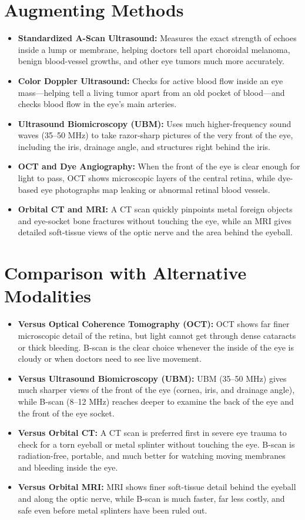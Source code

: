 \section{Augmenting Methods}
\begin{itemize}
    \item \textbf{Standardized A-Scan Ultrasound:} Measures the exact strength of echoes inside a lump or membrane, helping doctors tell apart choroidal melanoma, benign blood-vessel growths, and other eye tumors much more accurately.
    \item \textbf{Color Doppler Ultrasound:} Checks for active blood flow inside an eye mass---helping tell a living tumor apart from an old pocket of blood---and checks blood flow in the eye's main arteries.
    \item \textbf{Ultrasound Biomicroscopy (UBM):} Uses much higher-frequency sound waves (35--50 MHz) to take razor-sharp pictures of the very front of the eye, including the iris, drainage angle, and structures right behind the iris.
    \item \textbf{OCT and Dye Angiography:} When the front of the eye is clear enough for light to pass, OCT shows microscopic layers of the central retina, while dye-based eye photographs map leaking or abnormal retinal blood vessels.
    \item \textbf{Orbital CT and MRI:} A CT scan quickly pinpoints metal foreign objects and eye-socket bone fractures without touching the eye, while an MRI gives detailed soft-tissue views of the optic nerve and the area behind the eyeball.
\end{itemize}

\section{Comparison with Alternative Modalities}
\begin{itemize}
    \item \textbf{Versus Optical Coherence Tomography (OCT):} OCT shows far finer microscopic detail of the retina, but light cannot get through dense cataracts or thick bleeding. B-scan is the clear choice whenever the inside of the eye is cloudy or when doctors need to see live movement.
    \item \textbf{Versus Ultrasound Biomicroscopy (UBM):} UBM (35--50 MHz) gives much sharper views of the front of the eye (cornea, iris, and drainage angle), while B-scan (8--12 MHz) reaches deeper to examine the back of the eye and the front of the eye socket.
    \item \textbf{Versus Orbital CT:} A CT scan is preferred first in severe eye trauma to check for a torn eyeball or metal splinter without touching the eye. B-scan is radiation-free, portable, and much better for watching moving membranes and bleeding inside the eye.
    \item \textbf{Versus Orbital MRI:} MRI shows finer soft-tissue detail behind the eyeball and along the optic nerve, while B-scan is much faster, far less costly, and safe even before metal splinters have been ruled out.
\end{itemize}


